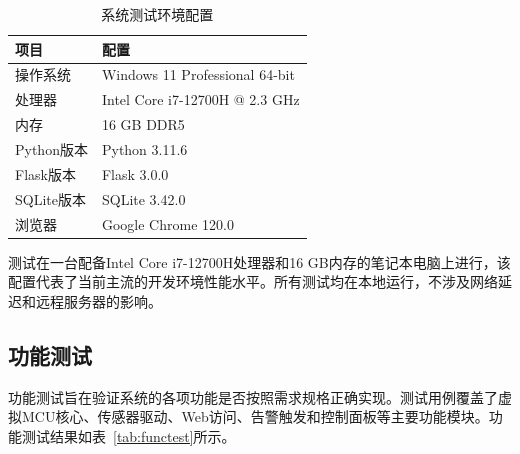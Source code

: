 \documentclass[12pt,a4paper]{ctexart}
\begin{document}
\begin{table}[H]
    \centering
    \caption{系统测试环境配置}
    \label{tab:testenv}
    \begin{tabular}{@{}ll@{}}
        \toprule
        \textbf{项目} & \textbf{配置} \\
        \midrule
        操作系统 & Windows 11 Professional 64-bit \\
        处理器 & Intel Core i7-12700H @ 2.3 GHz \\
        内存 & 16 GB DDR5 \\
        Python版本 & Python 3.11.6 \\
        Flask版本 & Flask 3.0.0 \\
        SQLite版本 & SQLite 3.42.0 \\
        浏览器 & Google Chrome 120.0 \\
        \bottomrule
    \end{tabular}
\end{table}

测试在一台配备Intel Core i7-12700H处理器和16 GB内存的笔记本电脑上进行，该配置代表了当前主流的开发环境性能水平。所有测试均在本地运行，不涉及网络延迟和远程服务器的影响。

\subsection{功能测试}

功能测试旨在验证系统的各项功能是否按照需求规格正确实现。测试用例覆盖了虚拟MCU核心、传感器驱动、Web访问、告警触发和控制面板等主要功能模块。功能测试结果如表~\ref{tab:functest}所示。
\end{document}
